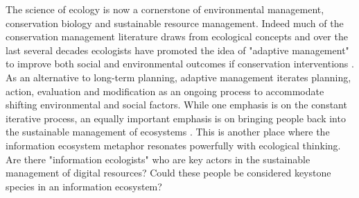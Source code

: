  The science of ecology is now a cornerstone of environmental management, conservation biology and sustainable resource management. Indeed much of the conservation management literature draws from ecological concepts and over the last several decades ecologists have promoted the idea of "adaptive management" to improve both social and environmental outcomes if conservation interventions \citep{holling_1978, leopold_1963}. As an alternative to long-term planning, adaptive management iterates planning, action, evaluation and modification as an ongoing process to accommodate shifting environmental and social factors. While one emphasis is on the constant iterative process, an equally important emphasis is on bringing people back into the sustainable management of ecosystems \citep{berkes_2000,holling_2002}. This is another place where the information ecosystem metaphor resonates powerfully with ecological thinking. Are there "information ecologists" who are key actors in the sustainable management of digital resources? Could these people be considered keystone species in an information ecosystem?